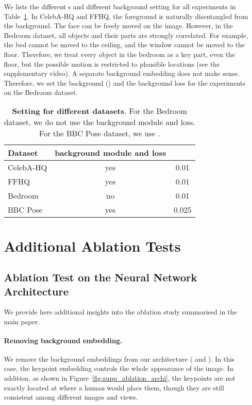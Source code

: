 \documentclass[10pt, conference, compsocconf]{IEEEtran}
\begin{document}
We lists the different s and different background setting for all experiments in Table~\ref{tab:setting_datasets}.  In CelebA-HQ and FFHQ, the foreground is naturally disentangled from the background. The face can be freely moved on the image. However, in the Bedroom dataset, all objects and their parts are strongly correlated.
For example, the bed cannot be moved to the ceiling, and the window cannot be moved to the floor. Therefore, we treat every object in the bedroom as a key part, even the floor, but the possible motion is restricted to plausible locations (see the supplementary video). A separate background embedding does not make sense. Therefore, we set the background () and the background loss  for the experiments on the Bedroom dataset.

\begin{table}
\begin{center}
\begin{tabular}{|l|c|c|}
\hline
Dataset & background module and loss & \\ 
\hline
CelebA-HQ & yes & 0.01\\ 
FFHQ & yes & 0.01\\ 
Bedroom & no & 0.01\\
BBC Pose & yes & 0.025\\  \hline
\end{tabular}
\end{center}
\caption{\textbf{Setting for different datasets}. For the Bedroom dataset, we do not use the background module and loss. For the BBC Pose dataset, we use .}
\label{tab:setting_datasets}
\end{table} \section{Additional Ablation Tests} \label{sec:ablation_test}

\subsection{Ablation Test on the Neural Network Architecture}

We provide here additional insights into the ablation study summarised in the main paper.


\paragraph{Removing background embedding.} We remove the background embeddings from our architecture ( and ). In this case, the keypoint embedding controls the whole appearance of the image. In addition, as shown in Figure~\ref{fig:supp_ablation_archi}, the keypoints are not exactly located at where a human would place them, though they are still consistent among different images and views.
\end{document}
